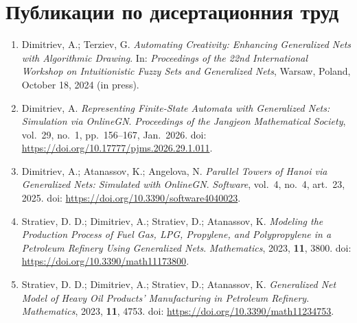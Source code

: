 \clearpage
{}
{}
\section*{Публикации по дисертационния труд}

\begin{enumerate}[label=\arabic*.]

\item Dimitriev, A.; Terziev, G.
\newblock \emph{Automating Creativity: Enhancing Generalized Nets with Algorithmic Drawing}.
\newblock In: \emph{Proceedings of the 22nd International Workshop on Intuitionistic Fuzzy Sets and Generalized Nets}, Warsaw, Poland, October 18, 2024 (in press).

\item Dimitriev, A.
\newblock \emph{Representing Finite-State Automata with Generalized Nets: Simulation via OnlineGN}.
\newblock \emph{Proceedings of the Jangjeon Mathematical Society}, vol.~29, no.~1, pp.~156--167, Jan.~2026.
\newblock doi: \url{https://doi.org/10.17777/pjms.2026.29.1.011}.  

\item Dimitriev, A.; Atanassov, K.; Angelova, N.
\newblock \emph{Parallel Towers of Hanoi via Generalized Nets: Simulated with OnlineGN}.
\newblock \emph{Software}, vol.~4, no.~4, art.~23, 2025.
\newblock doi: \url{https://doi.org/10.3390/software4040023}.

\item Stratiev, D. D.; Dimitriev, A.; Stratiev, D.; Atanassov, K.
\newblock \emph{Modeling the Production Process of Fuel Gas, LPG, Propylene, and Polypropylene in a Petroleum Refinery Using Generalized Nets}.
\newblock \emph{Mathematics}, 2023, \textbf{11}, 3800.
\newblock doi: \url{https://doi.org/10.3390/math11173800}.

\item Stratiev, D. D.; Dimitriev, A.; Stratiev, D.; Atanassov, K.
\newblock \emph{Generalized Net Model of Heavy Oil Products' Manufacturing in Petroleum Refinery}.
\newblock \emph{Mathematics}, 2023, \textbf{11}, 4753.
\newblock doi: \url{https://doi.org/10.3390/math11234753}.

\end{enumerate}
